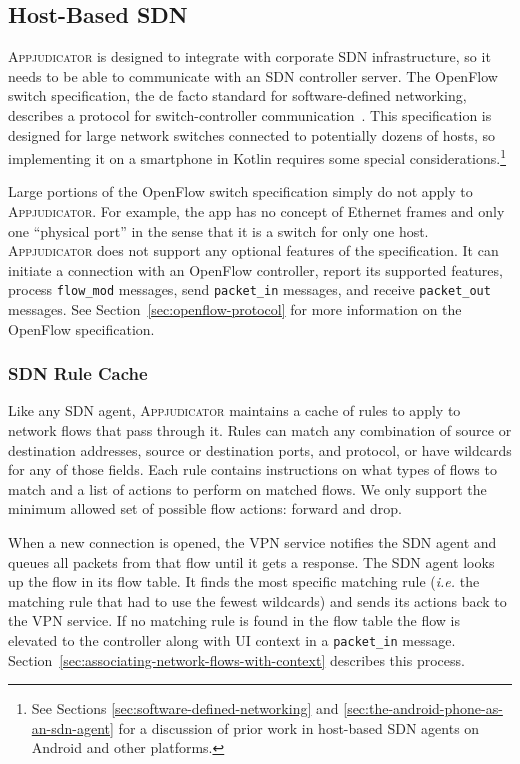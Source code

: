
\subsection{Host-Based SDN}
\label{sec:host-based-sdn}

\textsc{Appjudicator} is designed to integrate with corporate SDN
infrastructure, so it needs to be able to communicate with an SDN controller
server. The OpenFlow switch specification, the de facto standard for
software-defined networking, describes a protocol for switch-controller
communication~\cite{openflowspec}. This specification is designed for large
network switches connected to potentially dozens of hosts, so implementing it on
a smartphone in Kotlin requires some special considerations.\footnote{See
Sections \ref{sec:software-defined-networking} and
\ref{sec:the-android-phone-as-an-sdn-agent} for a discussion of prior work in
host-based SDN agents on Android and other platforms.}

Large portions of the OpenFlow switch specification simply do not apply to
\textsc{Appjudicator}. For example, the app has no concept of Ethernet frames
and only one ``physical port'' in the sense that it is a switch for only one
host. \textsc{Appjudicator} does not support any optional features of the
specification. It can initiate a connection with an OpenFlow controller, report
its supported features, process \texttt{flow\_mod} messages, send
\texttt{packet\_in} messages, and receive \texttt{packet\_out} messages. See
Section~\ref{sec:openflow-protocol} for more information on the OpenFlow
specification.

\subsubsection{SDN Rule Cache}
\label{sec:implementation-sdn-rule-cache}

Like any SDN agent, \textsc{Appjudicator} maintains a cache of rules to apply to
network flows that pass through it. Rules can match any combination of source or
destination addresses, source or destination ports, and protocol, or have
wildcards for any of those fields. Each rule contains instructions on what types
of flows to match and a list of actions to perform on matched flows. We only
support the minimum allowed set of possible flow actions: forward and drop.

When a new connection is opened, the VPN service notifies the SDN agent and
queues all packets from that flow until it gets a response. The SDN agent looks
up the flow in its flow table. It finds the most specific matching rule
(\textit{i.e.} the matching rule that had to use the fewest wildcards) and sends
its actions back to the VPN service. If no matching rule is found in the flow
table the flow is elevated to the controller along with UI context in a
\texttt{packet\_in} message. 
Section~\ref{sec:associating-network-flows-with-context} describes this process.


